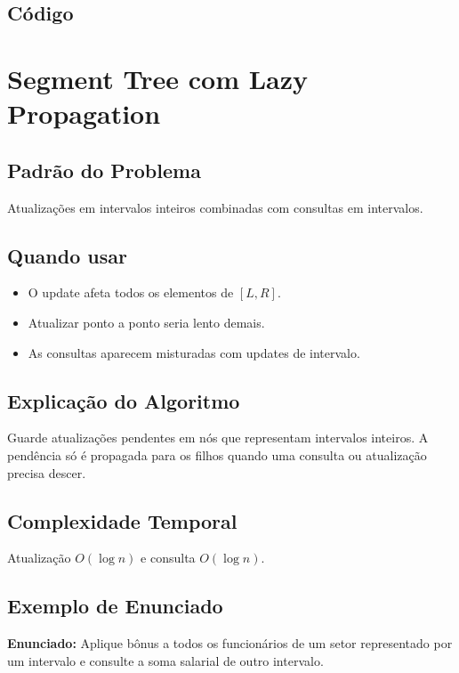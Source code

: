 \subsection{Código}

\section{Segment Tree com Lazy Propagation}

\subsection{Padrão do Problema}
Atualizações em intervalos inteiros combinadas com consultas em intervalos.

\subsection{Quando usar}
\begin{itemize}[nosep]
  \item O update afeta todos os elementos de $[L,R]$.
  \item Atualizar ponto a ponto seria lento demais.
  \item As consultas aparecem misturadas com updates de intervalo.
\end{itemize}

\subsection{Explicação do Algoritmo}
Guarde atualizações pendentes em nós que representam intervalos inteiros. A pendência só é propagada para os filhos quando uma consulta ou atualização precisa descer.

\subsection{Complexidade Temporal}
Atualização $O(\log n)$ e consulta $O(\log n)$.

\subsection{Exemplo de Enunciado}
\begin{exemplodiabox}
\textbf{Enunciado:} Aplique bônus a todos os funcionários de um setor representado por um intervalo e consulte a soma salarial de outro intervalo.
\end{exemplodiabox}

